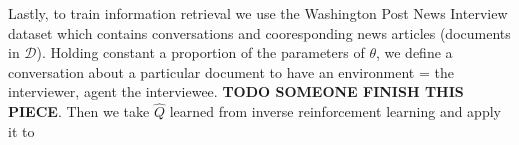 \documentclass{article} %
\theoremstyle{named}
\def\scriptd{{\mathcal D}}
\begin{document}
Lastly, to train information retrieval we use the Washington Post News Interview dataset which contains conversations and cooresponding news articles (documents in $\scriptd$). Holding constant a proportion of the parameters of $\theta$, we define a conversation about a particular document to have an environment = the interviewer, agent the interviewee. \textbf{TODO SOMEONE FINISH THIS PIECE}. Then we take  $\hat{Q}$ learned from inverse reinforcement learning and apply it to


\printbibliography
\end{document}
